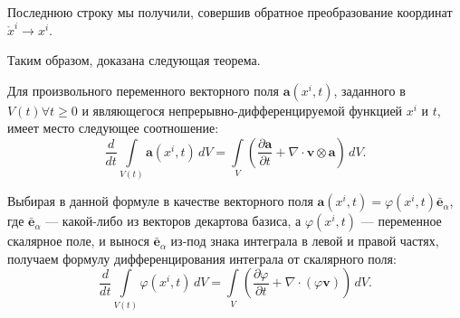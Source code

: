 Последнюю строку мы получили, совершив обратное преобразование координат $\mathring{x}^i \to x^i$.

Таким образом, доказана следующая теорема.
\begin{theorem}
	Для произвольного переменного векторного поля $\mathbf{a}(x^i, t)$, заданного в $V(t) \forall t \geqslant 0$ и являющегося непрерывно-дифференцируемой функцией $x^i$ и $t$, имеет место следующее соотношение:
	\begin{equation*}
		\frac{d}{dt} \int\limits_{V(t)} \mathbf{a}(x^i, t) \, dV = \int\limits_{V} \left(\frac{\partial \mathbf{a}}{\partial t} + \nabla \cdot \mathbf{v} \otimes \mathbf{a}\right) \, dV.
	\end{equation*} 
	
	Выбирая в данной формуле в качестве векторного поля $\mathbf{a}(x^i, t) = \varphi(x^i, t) \bar{\mathbf{e}}_{\alpha}$, где $\bar{\mathbf{e}}_{\alpha}$ --- какой-либо из векторов декартова базиса, а $\varphi(x^i, t)$ --- переменное скалярное поле, и вынося $\bar{\mathbf{e}}_{\alpha}$ из-под знака интеграла в левой и правой частях, получаем формулу дифференцирования интеграла от скалярного поля: 
	\begin{equation*}
		\frac{d}{dt} \int\limits_{V(t)} \varphi(x^i, t) \, dV = \int\limits_{V} \left(\frac{\partial \varphi}{\partial t} + \nabla \cdot (\varphi \mathbf{v})\right) \, dV. 
	\end{equation*}
\end{theorem}